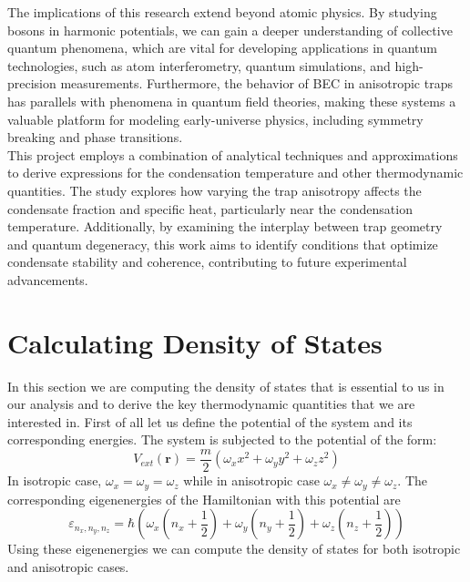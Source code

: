 \documentclass{article}
\numberwithin{equation}{section}
\numberwithin{equation}{subsection}
\begin{document}
  The implications of this research extend beyond atomic physics. By studying bosons in harmonic potentials, we can gain a deeper understanding of collective quantum phenomena, which are vital for developing applications in quantum technologies, such as atom interferometry, quantum simulations, and high-precision measurements. Furthermore, the behavior of BEC in anisotropic traps has parallels with phenomena in quantum field theories, making these systems a valuable platform for modeling early-universe physics, including symmetry breaking and phase transitions.\\
  
  This project employs a combination of analytical techniques and approximations to derive expressions for the condensation temperature and other thermodynamic quantities. The study explores how varying the trap anisotropy affects the condensate fraction and specific heat, particularly near the condensation temperature. Additionally, by examining the interplay between trap geometry and quantum degeneracy, this work aims to identify conditions that optimize condensate stability and coherence, contributing to future experimental advancements.\\
  

\section{Calculating Density of States}
  In this section we are computing the density of states that is essential to us in our analysis and to derive the key thermodynamic quantities that we are interested in. First of all let us define the potential of the system and its corresponding energies. 
  The system is subjected to the potential of the form:
  \begin{equation}
    V_{ext}(\mathbf{r})=\frac{m}{2}(\omega_{\mathit{x}}x^2+\omega_{\mathit{y}}y^2+\omega_{\mathit{z}}z^2)
  \end{equation}
  In isotropic case, $\omega_{\mathit{x}} = \omega_{\mathit{y}} = \omega_{\mathit{z}}$ while in anisotropic case $\omega_{\mathit{x}} \neq \omega_{\mathit{y}} \neq \omega_{\mathit{z}}$. The corresponding eigenenergies of the Hamiltonian with this potential are 
  \begin{equation}
    \varepsilon_{\mathit{n}_{\mathit{x}},\mathit{n}_{\mathit{y}},\mathit{n}_{\mathit{z}}} = \hbar\left(\omega_{\mathit{x}}\left(\mathit{n}_{\mathit{x}}+\frac{1}{2}\right)+\omega_{\mathit{y}}\left(\mathit{n}_{\mathit{y}}+\frac{1}{2}\right)+\omega_{\mathit{z}}\left(\mathit{n}_{\mathit{z}}+\frac{1}{2}\right)\right)
  \end{equation}
Using these eigenenergies we can compute the density of states for both isotropic and anisotropic cases.\\
\end{document}
